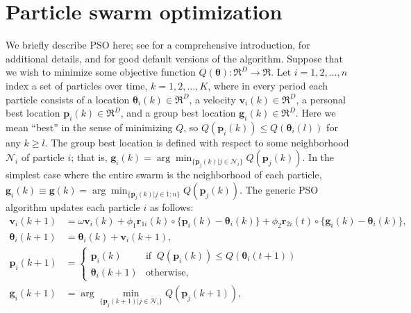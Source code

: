 \documentclass[cmbright]{staauth}
\begin{document}
\section{Particle swarm optimization}\label{sec:pso}
We briefly describe PSO here; see \cite{blum2008swarm} for a comprehensive introduction, \cite{clerc2010particle} for additional details, and \cite{clerc2011spso} for good default versions of the algorithm. Suppose that we wish to minimize some objective function $Q(\bm{\theta}):\Re^D\to\Re$. Let $i=1,2,\dots,n$ index a set of particles over time, $k=1,2,\dots,K$, where in every period each particle consists of a location $\bm{\theta}_i(k)\in \Re^D$, a velocity $\bm{v}_i(k) \in \Re^D$, a personal best location $\bm{p}_i(k)\in\Re^D$, and a group best location $\bm{g}_i(k)\in\Re^D$. Here we mean ``best'' in the sense of minimizing $Q$, so $Q(\bm{p}_i(k)) \leq Q(\bm{\theta}_i(l))$ for any $k\geq l$. The group best location is defined with respect to some neighborhood $\mathcal{N}_i$ of particle $i$; that is, $\bm{g}_i(k) = \arg\min_{\{\bm{p}_j(k)|j\in\mathcal{N}_i\}}Q(\bm{p}_j(k))$. In the simplest case where the entire swarm is the neighborhood of each particle, $\bm{g}_i(k)\equiv \bm{g}(k) = \arg\min_{\{\bm{p}_j(k)|j\in 1:n\}}Q(\bm{p}_j(k))$. The generic PSO algorithm updates each particle $i$ as follows:
\begin{align}\label{eq:pso}
\bm{v}_i(k+1) &= \omega \bm{v}_i(k) + \phi_1 \bm{r}_{1i}(k)\circ\{\bm{p}_i(k) - \bm{\theta}_i(k)\} + \phi_2 \bm{r}_{2i}(t)\circ\{\bm{g}_i(k) - \bm{\theta}_i(k)\},\nonumber\\
\bm{\theta}_i(k+1) &= \bm{\theta}_i(k) + \bm{v}_i(k+1),\nonumber\\
\bm{p}_i(k+1) &= \begin{cases} \bm{p}_i(k)   & \mbox{if }\  Q(\bm{p}_i(k)) \le Q(\bm{\theta}_i(t + 1))\\
                               \bm{\theta}_i(k+1) & \mbox{otherwise},
\end{cases}\nonumber\\
\bm{g}_i(k+1) &= \arg\min_{\{\bm{p}_j(k+1)|j\in\mathcal{N}_i\}}Q(\bm{p}_j(k+1)),
\end{align}
\end{document}
